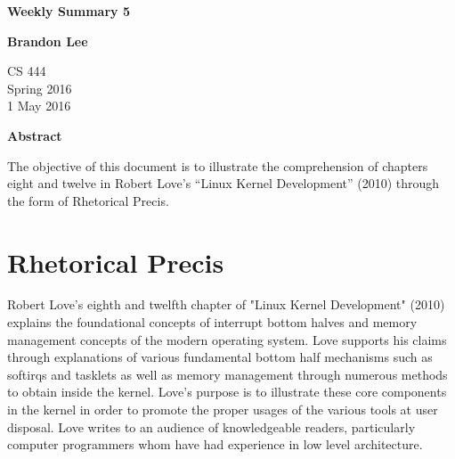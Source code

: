 \documentclass[letterpaper,10pt,titlepage]{article}
\begin{document}
\begin{titlepage}
    \begin{center}
        \vspace*{3.5cm}

        \textbf{Weekly Summary 5}

        \vspace{0.5cm}

        \textbf{Brandon Lee}

        \vspace{0.8cm}

        CS 444\\
        Spring 2016\\
        1 May 2016\\

        \vspace{1cm}

        \textbf{Abstract}\\

        \vspace{0.5cm}

        The objective of this document is to illustrate the comprehension of chapters eight and twelve in Robert Love's “Linux Kernel Development” (2010) through the form of Rhetorical Precis.


        \vfill



    \end{center}
\end{titlepage}

\newpage

\section{Rhetorical Precis}

Robert Love's eighth and twelfth chapter of "Linux Kernel Development" (2010) explains the foundational concepts of interrupt bottom halves and memory management concepts of the modern operating system. Love supports his claims through explanations of various fundamental bottom half mechanisms such as softirqs and tasklets as well as memory management through numerous methods to obtain inside the kernel. Love's purpose is to illustrate these core components in the kernel in order to promote the proper usages of the various tools at user disposal. Love writes to an audience of knowledgeable readers, particularly computer programmers whom have had experience in low level architecture.
\end{document}
